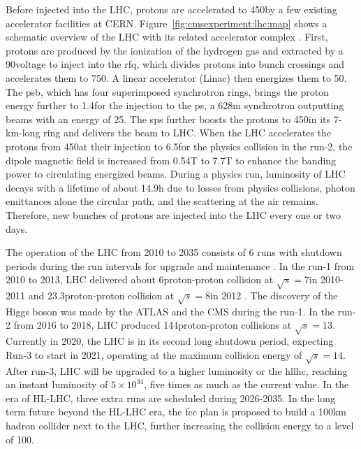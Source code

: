 Before injected into the LHC, protons are accelerated to 450\GeV by a few existing accelerator facilities at CERN. Figure~\ref{fig:cmsexperiment:lhc:map} shows a schematic overview of the LHC with its related accelerator complex  \cite{exhep:lhcInject:Benedikt:2004wm}. First, protons are produced by the ionization of the hydrogen gas and extracted by a 90\keV voltage to inject into the \acrfull{rfq}, which divides protons into bunch crossings and accelerates them to 750\keV. A linear accelerator (Linac) then energizes them to 50\MeV. The \acrfull{psb}, which has four superimposed synchrotron rings, brings the proton energy further to 1.4\GeV for the injection to the \acrfull{ps}, a 628m synchrotron outputting beams with an energy of 25\GeV. The \acrfull{sps} further boosts the protons to 450\GeV in its 7-km-long ring and delivers the beam to LHC. When the LHC accelerates the protons from 450\GeV at their injection to 6.5\TeV for the physics collision in the run-2, the dipole magnetic field is increased from 0.54T to 7.7T to enhance the banding power to circulating energized beams. During a physics run, luminosity of LHC decays with a lifetime of about 14.9h \cite{exhep:lhc:Evans:2008zzb} due to losses from physics collisions, photon emittances alone the circular path, and the scattering at the air remains. Therefore, new bunches of protons are injected into the LHC every one or two days.



The operation of the LHC from 2010 to 2035 consists of 6 runs with shutdown periods during the run intervals for upgrade and maintenance . In the run-1 from 2010 to 2013, LHC delivered about 6\fbinv proton-proton collision at $\sqrt{s}=7$\TeV in 2010-2011 and 23.3\fbinv proton-proton collision at $\sqrt{s}=8$\TeV in 2012 \cite{cms:publicLumiInfo}. The discovery of the Higgs boson was made by the ATLAS \cite{exhep:atlasHiggsDisc:Aad:2012tfa} and the CMS \cite{exhep:cmsHiggsDisc:Chatrchyan:2012ufa} during the run-1. In the run-2 from 2016 to 2018, LHC produced 144\fbinv proton-proton collisions at $\sqrt{s}=13$\TeV \cite{cms:publicLumiInfo}. Currently in 2020, the LHC is in its second long shutdown period, expecting Run-3 to start in 2021, operating at the maximum collision energy of $\sqrt{s}=14$\TeV. After run-3, LHC will be upgraded to a higher luminosity or the \acrfull{hllhc}, reaching an instant luminosity of $5 \times 10^{34}$\percms, five times as much as the current value. In the era of HL-LHC, three extra runs are scheduled during 2026-2035. In the long term future beyond the HL-LHC era, the \acrfull{fcc} \cite{exhep:fcc:Benedikt:2715354} plan is proposed to build a 100km hadron collider next to the LHC, further increasing the collision energy to a level of 100\TeV.